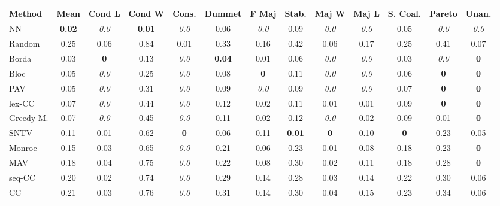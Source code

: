 \begin{tabular}{lcccccccccccc}
\toprule
Method & Mean & Cond L & Cond W & Cons. & Dummet & F Maj & Stab. & Maj W & Maj L & S. Coal. & Pareto & Unan. \\
\midrule
NN & \textbf{0.02} & \textit{0.0} & \textbf{0.01} & \textit{0.0} & 0.06 & \textit{0.0} & 0.09 & \textit{0.0} & \textit{0.0} & 0.05 & \textit{0.0} & \textit{0.0} \\
Random & 0.25 & 0.06 & 0.84 & 0.01 & 0.33 & 0.16 & 0.42 & 0.06 & 0.17 & 0.25 & 0.41 & 0.07 \\
Borda & 0.03 & \textbf{0} & 0.13 & \textit{0.0} & \textbf{0.04} & 0.01 & 0.06 & \textit{0.0} & \textit{0.0} & 0.03 & \textit{0.0} & \cellcolor{green!25}\textbf{0} \\
Bloc & 0.05 & \textit{0.0} & 0.25 & \textit{0.0} & 0.08 & \textbf{0} & 0.11 & \textit{0.0} & \textit{0.0} & 0.06 & \textbf{0} & \textbf{0} \\
PAV & 0.05 & \textit{0.0} & 0.31 & \textit{0.0} & 0.09 & \textit{0.0} & 0.09 & \textit{0.0} & \textit{0.0} & 0.07 & \cellcolor{green!25}\textbf{0} & \textbf{0} \\
lex-CC & 0.07 & \textit{0.0} & 0.44 & \textit{0.0} & 0.12 & 0.02 & 0.11 & 0.01 & 0.01 & 0.09 & \textbf{0} & \textbf{0} \\
Greedy M. & 0.07 & \textit{0.0} & 0.45 & \textit{0.0} & 0.11 & 0.02 & 0.12 & \textit{0.0} & 0.02 & 0.09 & 0.01 & \textbf{0} \\
SNTV & 0.11 & 0.01 & 0.62 & \textbf{0} & 0.06 & 0.11 & \textbf{0.01} & \textbf{0} & 0.10 & \textbf{0} & 0.23 & 0.05 \\
Monroe & 0.15 & 0.03 & 0.65 & \cellcolor{green!25}\textit{0.0} & 0.21 & 0.06 & 0.23 & 0.01 & 0.08 & 0.18 & 0.23 & \cellcolor{green!25}\textbf{0} \\
MAV & 0.18 & 0.04 & 0.75 & \textit{0.0} & 0.22 & 0.08 & 0.30 & 0.02 & 0.11 & 0.18 & 0.28 & \textbf{0} \\
seq-CC & 0.20 & 0.02 & 0.74 & \textit{0.0} & 0.29 & 0.14 & 0.28 & 0.03 & 0.14 & 0.22 & 0.30 & 0.06 \\
CC & 0.21 & 0.03 & 0.76 & \cellcolor{green!25}\textit{0.0} & 0.31 & 0.14 & 0.30 & 0.04 & 0.15 & 0.23 & 0.34 & 0.06 \\
\bottomrule
\end{tabular}
